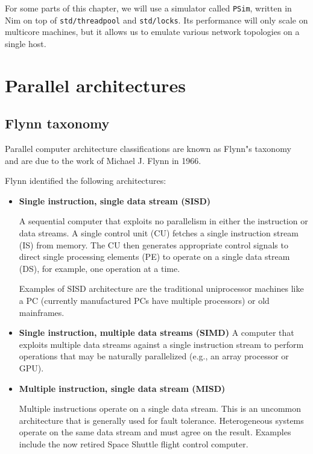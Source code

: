 \documentclass[justified, sixbynine]{tufte-book}
\def\ft{\small\tt}
\theoremstyle{plain}%
\newtheorem * {corollary}{Corollary}
\theoremstyle{definition}
\theoremstyle{remark}
\newtheorem * {remark}{Remark}
\newtheorem * {note}{Note}
\begin{document}
\begin{fullwidth}
For some parts of this chapter, we will use a simulator called {\ft PSim}, written in Nim on top of {\ft std/threadpool} and {\ft std/locks}. Its performance will only scale on multicore machines, but it allows us to emulate various network topologies on a single host.

\section{Parallel architectures}

\goodbreak\subsection{Flynn taxonomy}



Parallel computer architecture classifications are known as Flynn"s taxonomy~\cite{flynn} and are due to the work of Michael J. Flynn in 1966.

Flynn identified the following architectures:

\begin{itemize}
\item {\bf Single instruction, single data stream (SISD)}

A sequential computer that exploits no parallelism in either the instruction or data streams. A single control unit (CU) fetches a single instruction stream (IS) from memory. The CU then generates appropriate control signals to direct single processing elements (PE) to operate on a single data stream (DS), for example, one operation at a time.

Examples of SISD architecture are the traditional uniprocessor machines like a PC (currently manufactured PCs have multiple processors) or old mainframes.

\item {\bf Single instruction, multiple data streams (SIMD)}
A  computer  that   exploits   multiple  data   streams   against  a  single instruction stream  to perform operations that  may be naturally parallelized (e.g., an array processor or GPU).

\item {\bf Multiple instruction, single data stream (MISD)}

Multiple instructions operate on a single data stream. This is an uncommon architecture that is generally used for fault tolerance. Heterogeneous systems operate on the same data stream and must agree on the result. Examples include the now retired Space Shuttle flight control computer.


\end{itemize}
\end{fullwidth}
\end{document}

